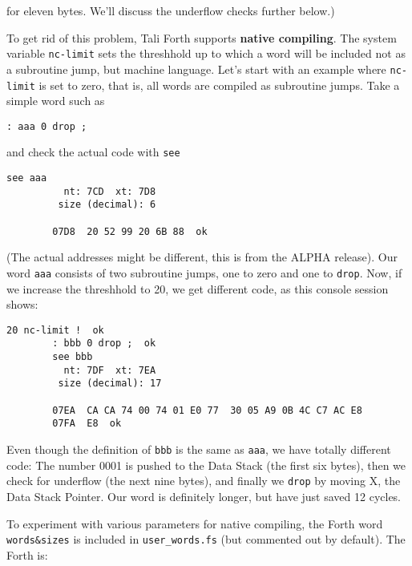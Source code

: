 \noindent for eleven bytes. We'll discuss the underflow checks further below.)

To get rid of this problem, Tali Forth supports \textbf{native
compiling}. The system variable
\texttt{nc-limit} sets
the threshhold up to which a word will be included not as a subroutine jump, but
machine language. Let's start with an example where \texttt{nc-limit} is set to
zero, that is, all words are compiled as subroutine jumps. Take a simple word
such as

\begin{lstlisting}[frame=lines]
        : aaa 0 drop ;
\end{lstlisting}

\noindent and check the actual code with \texttt{see}

\begin{lstlisting}[frame=lines]
        see aaa
          nt: 7CD  xt: 7D8
         size (decimal): 6

        07D8  20 52 99 20 6B 88  ok
\end{lstlisting}

\noindent (The actual addresses might be different, this is from the ALPHA release).  Our
word \texttt{aaa} consists of two subroutine jumps, one to zero and one to
\texttt{drop}. Now, if we increase the threshhold to 20, we get different code,
as this console session shows:

\begin{lstlisting}[frame=lines]
        20 nc-limit !  ok
        : bbb 0 drop ;  ok
        see bbb
          nt: 7DF  xt: 7EA
         size (decimal): 17

        07EA  CA CA 74 00 74 01 E0 77  30 05 A9 0B 4C C7 AC E8
        07FA  E8  ok
\end{lstlisting}

\noindent Even though the definition of \texttt{bbb} is the same as \texttt{aaa}, we have
totally different code: The number 0001 is pushed to the Data Stack (the first
six bytes), then we check for underflow (the next nine bytes),
and finally we \texttt{drop} by moving X, the Data Stack
Pointer. Our word is definitely longer, but have just saved 12 cycles.

To experiment with various parameters for native compiling, the Forth word
\texttt{words\&sizes} is included in
\texttt{user\_words.fs} (but commented out by default). The Forth is:

